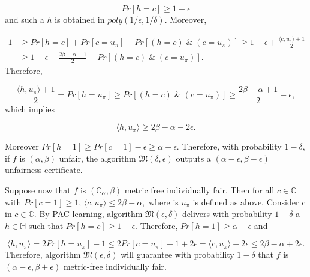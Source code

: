 \documentclass{article}
\begin{document}
$$ Pr[h=c] \geq 1- \epsilon$$ and such a $h$ is obtained in $poly(1/\epsilon, 1/\delta).$ Moreover, 

\begin{equation}
\begin{split}
    1 &\geq Pr[h=c] + Pr[c=u_{\pi}] - Pr[(h=c) \; \& \; (c=u_{\pi})] \geq 1-\epsilon + \frac{\langle c, u_{\pi}\rangle + 1}{2} \\
    & \geq 1-\epsilon + \frac{2\beta -\alpha + 1}{2}- Pr[(h=c) \; \& \; (c=u_{\pi})] .
    \end{split}
\end{equation}
Therefore,

$$  \frac{\langle h, u_{\pi}\rangle + 1}{2} =Pr[h=u_{\pi}] \geq Pr[(h=c) \; \& \; (c=u_{\pi})] \geq \frac{2\beta -\alpha + 1}{2} - \epsilon,$$
which implies 

$$\langle h, u_{\pi}\rangle  \geq 2\beta -\alpha -2 \epsilon.$$

Moreover $Pr[h=1]\geq Pr[c=1]-\epsilon\geq \alpha -\epsilon$. Therefore, with probability $1-\delta$, if $f$ is $(\alpha, \beta)$ unfair, the algorithm $\mathfrak{M}(\delta, \epsilon)$ outputs a $(\alpha-\epsilon, \beta-\epsilon)$ unfairness certificate. 

\bigskip
Suppose now that $f$ is $(\mathbb{C}_{\alpha}, \beta)$ metric free individually fair. Then for all $c\in \mathbb{C}$ with $Pr[c=1]\geq 1$, $\langle c, u_{\pi}\rangle \leq 2\beta -\alpha,$ where is $u_{\pi}$ is defined as above. Consider $c$ in  $c\in \mathbb{C}$. By PAC learning, algorithm $\mathfrak{M}(\epsilon, \delta)$ delivers with probability $1-\delta$ a $h\in \mathbb{H}$ such that $Pr[h=c]\geq 1-\epsilon.$ Therefore, $Pr[h=1] \geq \alpha -\epsilon$ and 

$$\langle h, u_{\pi}\rangle =  2 Pr[h=u_{\pi}] -1 \leq 2Pr[c=u_{\pi}] - 1 + 2\epsilon  = \langle c, u_{\pi} \rangle + 2\epsilon \leq 2\beta -\alpha + 2\epsilon.$$
Therefore, algorithm $\mathfrak{M}(\epsilon, \delta)$ will guarantee with probability $1-\delta$ that $f$ is $(\alpha-\epsilon, \beta + \epsilon)$ metric-free individually fair. 



\end{document}
